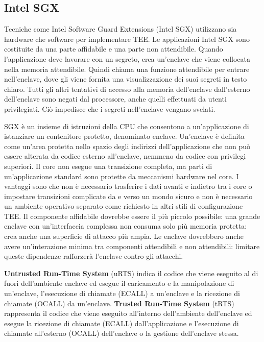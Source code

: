 \subsection{Intel SGX}
Tecniche come Intel Software Guard Extensions (Intel SGX) utilizzano sia
hardware che software per implementare TEE.
Le applicazioni Intel SGX sono costituite
da una parte affidabile e una parte non
attendibile. Quando l'applicazione deve
lavorare con un segreto, crea un'enclave
che viene collocata nella memoria
attendibile. Quindi chiama una funzione
attendibile per entrare nell'enclave,
dove gli viene fornita una visualizzazione
dei suoi segreti in testo chiaro.
Tutti gli altri tentativi di accesso alla memoria dell'enclave dall'esterno
dell'enclave sono negati dal processore, anche quelli effettuati da utenti
privilegiati. Ciò impedisce che i segreti nell'enclave vengano svelati.

SGX è un insieme di istruzioni della CPU che consentono a un'applicazione di
istanziare un contenitore protetto, denominato enclave. Un'enclave è definita come un'area protetta nello spazio degli indirizzi
dell'applicazione che non può essere alterata da codice esterno
all'enclave, nemmeno da codice con privilegi superiori. Il core non esegue una transizione completa, ma parti di un'applicazione
standard sono protette da meccanismi hardware nel core. I vantaggi sono che non è necessario trasferire i dati avanti e indietro tra
i core o impostare transizioni complicate da e verso un mondo sicuro e
non è necessario un ambiente operativo separato come richiesto in altri
stili di configurazione TEE. Il componente affidabile dovrebbe essere il più piccolo possibile: una
grande enclave con un'interfaccia complessa non consuma solo più
memoria protetta: crea anche una superficie di attacco più ampia. Le enclave dovrebbero anche avere un'interazione minima tra
componenti attendibili e non attendibili: limitare queste dipendenze
rafforzerà l'enclave contro gli attacchi.

\textbf{Untrusted Run-Time System} (uRTS) indica
il codice che viene eseguito al di fuori
dell'ambiente enclave ed esegue il
caricamento e la manipolazione di
un'enclave, l'esecuzione di chiamate
(ECALL) a un'enclave e la ricezione di
chiamate (OCALL) da un'enclave.
\textbf{Trusted Run-Time System} (tRTS)
rappresenta il codice che viene
eseguito all'interno dell'ambiente
dell'enclave ed esegue la ricezione
di chiamate (ECALL) dall'applicazione e l'esecuzione di chiamate
all'esterno (OCALL) dell'enclave o la
gestione dell'enclave stessa.

